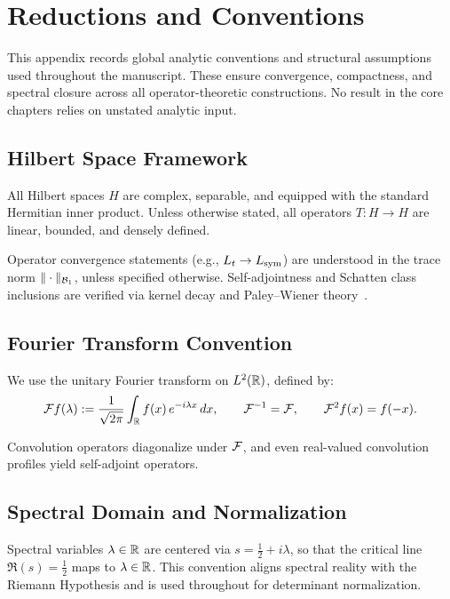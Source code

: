\section{Reductions and Conventions}
\label{app:reductions_and_conventions}

\noindent
This appendix records global analytic conventions and structural assumptions used throughout the manuscript. These ensure convergence, compactness, and spectral closure across all operator-theoretic constructions. No result in the core chapters relies on unstated analytic input.

\subsection*{Hilbert Space Framework}

All Hilbert spaces \( H \) are complex, separable, and equipped with the standard Hermitian inner product. Unless otherwise stated, all operators \( T \colon H \to H \) are linear, bounded, and densely defined.

Operator convergence statements (e.g., \( L_t \to L_{\mathrm{sym}} \)) are understood in the trace norm \( \|\cdot\|_{\mathcal{B}_1} \), unless specified otherwise. Self-adjointness and Schatten class inclusions are verified via kernel decay and Paley–Wiener theory~\cite{Simon2005TraceIdeals, ReedSimon1980I}.

\subsection*{Fourier Transform Convention}

We use the unitary Fourier transform on \( L^2(\mathbb{R}) \), defined by:
\[
\mathcal{F} f(\lambda) := \frac{1}{\sqrt{2\pi}} \int_{\mathbb{R}} f(x)\, e^{-i\lambda x}\, dx,
\qquad \mathcal{F}^{-1} = \mathcal{F}, \qquad \mathcal{F}^2 f(x) = f(-x).
\]

Convolution operators diagonalize under \( \mathcal{F} \), and even real-valued convolution profiles yield self-adjoint operators.

\subsection*{Spectral Domain and Normalization}

Spectral variables \( \lambda \in \mathbb{R} \) are centered via \( s = \tfrac{1}{2} + i\lambda \), so that the critical line \( \Re(s) = \tfrac{1}{2} \) maps to \( \lambda \in \mathbb{R} \). This convention aligns spectral reality with the Riemann Hypothesis and is used throughout for determinant normalization.

